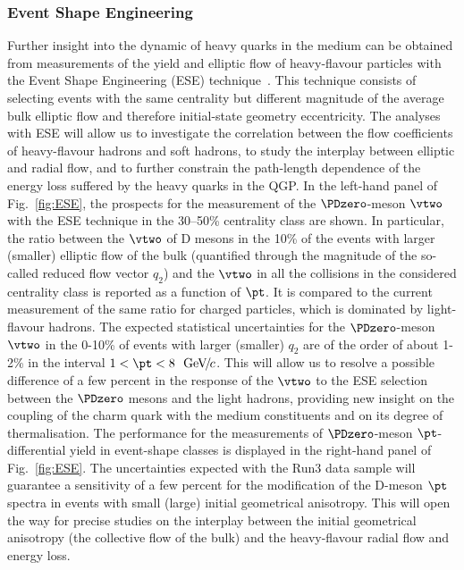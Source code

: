 
 
\subsubsection{Event Shape Engineering}

Further insight into the dynamic of heavy quarks in the medium can be
obtained from measurements of the yield and elliptic flow of heavy-flavour
particles with the Event Shape Engineering (ESE) 
technique~\cite{Schukraft:2012ah}.
This technique consists of selecting events with the same centrality but 
different magnitude of the average bulk elliptic flow and therefore initial-state geometry eccentricity.
The analyses with ESE will allow us to investigate the correlation between 
the flow coefficients of heavy-flavour hadrons and soft hadrons, to study the interplay between elliptic and radial flow, and to further constrain the path-length dependence of the energy loss suffered by the heavy quarks in the QGP.
In the left-hand panel of Fig.~\ref{fig:ESE}, the prospects for the measurement of the ${\PDzero}$-meson $\vtwo$ with the ESE technique in the 30--50\% centrality class are shown.
In particular, the ratio between the $\vtwo$ of D mesons in the 10\% of the events with larger (smaller) elliptic flow of the bulk (quantified through the magnitude of the so-called reduced flow vector $q_2$) and the $\vtwo$ in all the collisions in the considered centrality class is reported as a function of $\pt$.
It is compared to the current measurement of the same ratio for charged 
particles, which is dominated by light-flavour hadrons.
The expected statistical uncertainties for the $\PDzero$-meson $\vtwo$ in the 0-10\% of events with larger (smaller) $q_2$ are of the order of about 1-2\% in the interval $1 < \pt < 8~\UGeVc$. This will allow us to resolve a possible difference of a few percent in the response of the $\vtwo$ to the ESE selection between the $\PDzero$ mesons and the light hadrons, providing new insight on the coupling of the charm quark with the medium constituents and on its degree of thermalisation. 
The performance for the measurements of $\PDzero$-meson 
$\pt$-differential yield in event-shape classes is displayed in the right-hand panel of Fig.~\ref{fig:ESE}.
The uncertainties expected with the Run3 data sample will guarantee a sensitivity of a few percent for the modification of 
the D-meson $\pt$ spectra in events with small (large) initial 
geometrical anisotropy.
This will open the way for precise studies on the interplay between the initial geometrical anisotropy (the collective flow of the bulk) and the heavy-flavour radial flow and energy loss.

